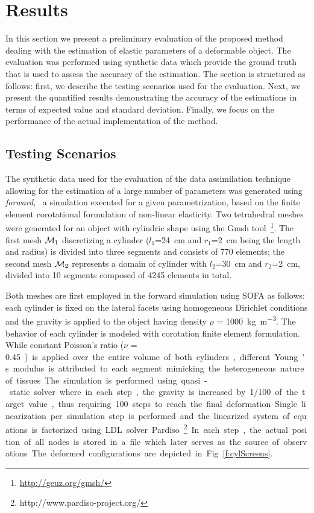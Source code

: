 \section{Results}
\label{s:results}
In this section we present a preliminary evaluation of the proposed method dealing with the estimation of elastic parameters of a deformable 
object. The evaluation was performed using synthetic data which provide the ground truth that is used to assess the accuracy of the 
estimation. The section is structured as follows: first, we describe the testing scenarios used for the evaluation. Next, we 
present the quantified results demonstrating the accuracy of the estimations in terms of expected value and standard deviation. Finally, 
we focus on the performance of the actual implementation of the method. 

\subsection{Testing Scenarios}
\label{sr:scenarios}
The synthetic data used for the evaluation of the data assimilation technique allowing for the estimation of a large number of parameters
was generated using \emph{forward}, \ie\ a simulation executed for a given parametrization, based on the finite element corotational formulation of non-linear elasticity. 
Two tetrahedral meshes were generated for an object with cylindric shape using the Gmsh tool~\footnote{\url{http://geuz.org/gmsh/}}. 
The first mesh $\mathcal{M}_1$ discretizing a cylinder ($l_1$=\SI{24}{\cm} and $r_1$=\SI{2}{\cm} being the length and radius) 
is divided into three segments and consists of 770 elements; the second mesh $\mathcal{M}_2$ represents a domain of cylinder 
with $l_2$=\SI{30}{\cm} and $r_2$=\SI{2}{\cm}, divided into 10 segments composed of 4245 elements in total. 

Both meshes are first employed in the forward simulation using SOFA as follows: each cylinder is fixed on the lateral facets
using homogeneous Dirichlet conditions and the gravity is applied to the object having density $\rho$ = \SI{1000}{\kg\per\cubic\metre}.
The behavior of each cylinder is modeled with corotation finite element formulation. While constant Poisson's ratio ($\nu$ = \SI{0.45})
is applied over the entire volume of both cylinders, different Young's modulus is attributed to each segment mimicking the 
heterogeneous nature of tissues. 
The simulation is performed using quasi-static solver where in each step, the gravity is increased by 1/100 of the target value, 
thus requiring 100 steps to reach the final deformation. Single linearization per simulation step is performed and the 
linearized system of equations is factorized using LDL solver Pardiso~\footnote{http://www.pardiso-project.org/}. 
In each step, the actual position of all nodes is stored in a file which later serves as the source of observations. The deformed configurations are depicted in Fig.~\ref{f:cylScreens}. 

